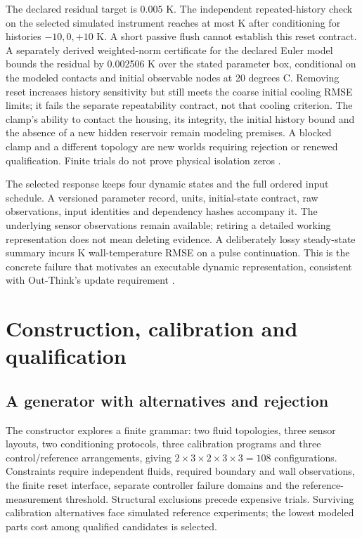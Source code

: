 \documentclass[11pt,letterpaper]{article}
\begin{document}
The declared residual target is $0.005$ K. The independent repeated-history check on the selected simulated instrument reaches at most \ResetResidual{} K after conditioning for histories $-10,0,+10$ K. A short passive flush cannot establish this reset contract. A separately derived weighted-norm certificate for the declared Euler model bounds the residual by 0.002506 K over the stated parameter box, conditional on the modeled contacts and initial observable nodes at 20 degrees C. Removing reset increases history sensitivity but still meets the coarse initial cooling RMSE limits; it fails the separate repeatability contract, not that cooling criterion. The clamp's ability to contact the housing, its integrity, the initial history bound and the absence of a new hidden reservoir remain modeling premises. A blocked clamp and a different topology are new worlds requiring rejection or renewed qualification. Finite trials do not prove physical isolation zeros \cite[pp.14--15]{world}.

The selected response keeps four dynamic states and the full ordered input schedule. A versioned parameter record, units, initial-state contract, raw observations, input identities and dependency hashes accompany it. The underlying sensor observations remain available; retiring a detailed working representation does not mean deleting evidence. A deliberately lossy steady-state summary incurs \LossyRMSE{} K wall-temperature RMSE on a pulse continuation. This is the concrete failure that motivates an executable dynamic representation, consistent with Out-Think's update requirement \cite[Proposition3.2]{outthink}.

\section{Construction, calibration and qualification}
\label{sec:construction}
\subsection{A generator with alternatives and rejection}
The constructor explores a finite grammar: two fluid topologies, three sensor layouts, two conditioning protocols, three calibration programs and three control/reference arrangements, giving $2\times3\times2\times3\times3=108$ configurations. Constraints require independent fluids, required boundary and wall observations, the finite reset interface, separate controller failure domains and the reference-measurement threshold. Structural exclusions precede expensive trials. Surviving calibration alternatives face simulated reference experiments; the lowest modeled parts cost among qualified candidates is selected.
\end{document}
